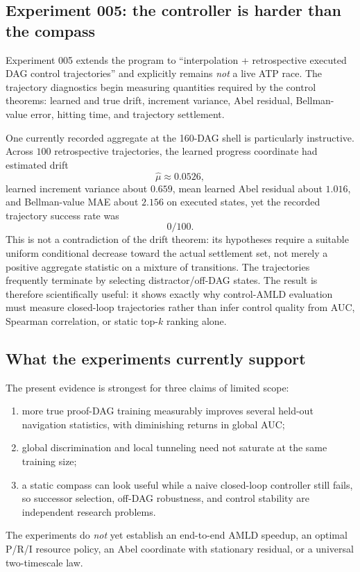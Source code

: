 \subsection{Experiment 005: the controller is harder than the compass}
Experiment 005 extends the program to ``interpolation + retrospective executed DAG control trajectories'' and explicitly remains \emph{not} a live ATP race. The trajectory diagnostics begin measuring quantities required by the control theorems: learned and true drift, increment variance, Abel residual, Bellman-value error, hitting time, and trajectory settlement.

One currently recorded aggregate at the 160-DAG shell is particularly instructive. Across $100$ retrospective trajectories, the learned progress coordinate had estimated drift
\[
 \widehat\mu\approx0.0526,
\]
learned increment variance about $0.659$, mean learned Abel residual about $1.016$, and Bellman-value MAE about $2.156$ on executed states, yet the recorded trajectory success rate was
\[
 0/100.
\]
This is not a contradiction of the drift theorem: its hypotheses require a suitable uniform conditional decrease toward the actual settlement set, not merely a positive aggregate statistic on a mixture of transitions. The trajectories frequently terminate by selecting distractor/off-DAG states. The result is therefore scientifically useful: it shows exactly why control-AMLD evaluation must measure closed-loop trajectories rather than infer control quality from AUC, Spearman correlation, or static top-$k$ ranking alone.

\subsection{What the experiments currently support}
The present evidence is strongest for three claims of limited scope:
\begin{enumerate}
\item more true proof-DAG training measurably improves several held-out navigation statistics, with diminishing returns in global AUC;
\item global discrimination and local tunneling need not saturate at the same training size;
\item a static compass can look useful while a naive closed-loop controller still fails, so successor selection, off-DAG robustness, and control stability are independent research problems.
\end{enumerate}
The experiments do \emph{not} yet establish an end-to-end AMLD speedup, an optimal P/R/I resource policy, an Abel coordinate with stationary residual, or a universal two-timescale law.

